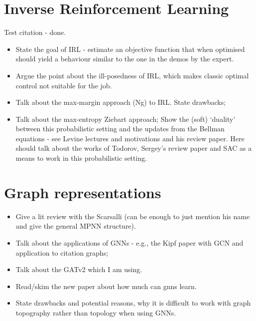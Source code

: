 \documentclass{report}
\numberwithin{equation}{section}
\numberwithin{figure}{section}
\numberwithin{table}{section}
\begin{document}
\chapter{Inverse Reinforcement Learning}
Test citation \citep{NgIRL} - done.
\begin{itemize}
  \item State the goal of IRL - estimate an objective function
    that when optimised should yield a behaviour similar to the 
    one in the demos by the expert.
  \item Argue the point about the ill-posedness of IRL, which makes 
    classic optimal control not suitable for the job.
  \item Talk about the max-margin approach (Ng) to IRL.
    State drawbacks;
  \item Talk about the max-entropy Ziebart approach;
    Show the (soft) `duality' between this probabilistic setting and 
    the updates from the Bellman equations - see Levine lectures 
    and motivations and his review paper. Here should talk about the 
    works of Todorov, Sergey's review paper and SAC as a means to 
    work in this probabilistic setting.
\end{itemize}

\chapter{Graph representations}
\begin{itemize}
  \item Give a lit review with the Scarsalli (can be enough to just 
  mention his name and give the general MPNN structure).
  \item Talk about the applications of GNNs - e.g., the Kipf paper 
    with GCN and application to citation graphs;
  \item Talk about the GATv2 which I am using.
  \item Read/skim the new paper about how much can gnns learn.
  \item State drawbacks and potential reasons, why it is difficult 
    to work with graph topography rather than topology when using 
    GNNs.
\end{itemize}

\end{document}
